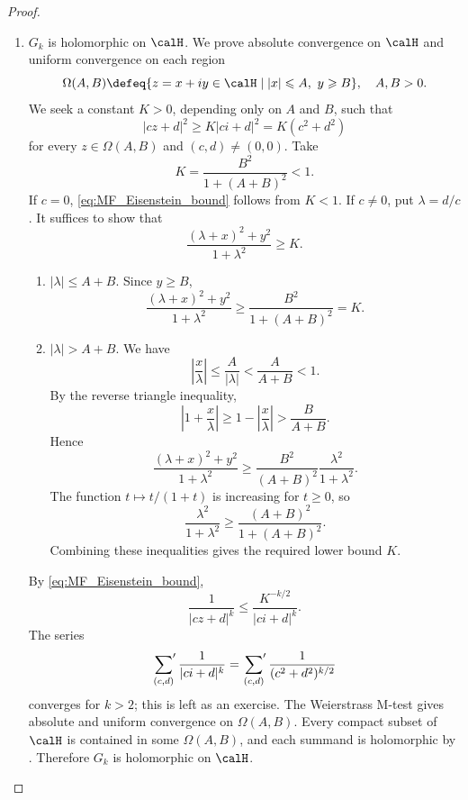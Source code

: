 \begin{proof}
    \leavevmode
    \begin{enumerate}[label=(\arabic*)]
        \item $G_k$ is holomorphic on $\calH$.
        We prove absolute convergence on $\calH$ and uniform convergence on each region
        \[
            \Omega(A, B) \defeq \{z = x + iy \in \calH \mid |x| \leqslant A,\ y \geqslant B\}, \quad A, B > 0.
        \]
        We seek a constant $K > 0$, depending only on $A$ and $B$, such that
        \begin{equation}\label{eq:MF_Eisenstein_bound}
            |cz + d|^2 \geqslant K|ci + d|^2 = K(c^2 + d^2)
        \end{equation}
        for every $z \in \Omega(A, B)$ and $(c, d) \neq (0, 0)$. Take
        \[
            K = \frac{B^2}{1 + (A + B)^2} < 1.
        \]
        If $c = 0$, \eqref{eq:MF_Eisenstein_bound} follows from $K < 1$. If $c \neq 0$, put $\lambda = d/c$. It suffices to show that
        \[
            \frac{(\lambda + x)^2 + y^2}{1 + \lambda^2} \geqslant K.
        \]
        \begin{enumerate}[label=\textbf{Case~\arabic*}]
            \item $|\lambda| \leqslant A + B$.
            Since $y \geqslant B$,
            \[
                \frac{(\lambda + x)^2 + y^2}{1 + \lambda^2} \geqslant \frac{B^2}{1 + (A + B)^2} = K.
            \]
            \item $|\lambda| > A + B$.
            We have
            \[
                \left|\frac{x}{\lambda}\right| \leqslant \frac{A}{|\lambda|} < \frac{A}{A + B} < 1.
            \]
            By the reverse triangle inequality,
            \[
                \left|1 + \frac{x}{\lambda}\right| \geqslant 1 - \left|\frac{x}{\lambda}\right| > \frac{B}{A + B}.
            \]
            Hence
            \[
                \frac{(\lambda + x)^2 + y^2}{1 + \lambda^2} \geqslant \frac{B^2}{(A + B)^2}\frac{\lambda^2}{1 + \lambda^2}.
            \]
            The function $t \mapsto t/(1 + t)$ is increasing for $t \geqslant 0$, so
            \[
                \frac{\lambda^2}{1 + \lambda^2} \geqslant \frac{(A + B)^2}{1 + (A + B)^2}.
            \]
            Combining these inequalities gives the required lower bound $K$.
        \end{enumerate}
        By \eqref{eq:MF_Eisenstein_bound},
        \[
            \frac{1}{|cz + d|^k} \leqslant \frac{K^{-k/2}}{|ci + d|^k}.
        \]
        The series
        \[
            \sideset{}{'}\sum_{(c, d)} \frac{1}{|ci + d|^k} = \sideset{}{'}\sum_{(c, d)} \frac{1}{(c^2 + d^2)^{k/2}}
        \]
        converges for $k > 2$; this is left as an exercise. The Weierstrass M-test gives absolute and uniform convergence on $\Omega(A, B)$. Every compact subset of $\calH$ is contained in some $\Omega(A, B)$, and each summand is holomorphic by . Therefore $G_k$ is holomorphic on $\calH$.


\end{enumerate}
\end{proof}
